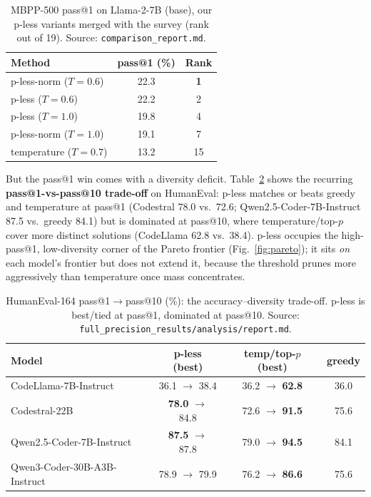\documentclass[11pt]{article}                       %
\begin{document}
\begin{table}[t]\centering
\caption{MBPP-500 pass@1 on Llama-2-7B (base), our p-less variants merged with the
\citet{shi2024decoding} survey (rank out of 19). Source: \texttt{comparison\_report.md}.}
\label{tab:mbpp}
\begin{tabular}{lcc}
\toprule
Method & pass@1 (\%) & Rank \\
\midrule
p-less-norm ($T{=}0.6$) & 22.3 & \textbf{1} \\
p-less ($T{=}0.6$)      & 22.2 & 2 \\
p-less ($T{=}1.0$)      & 19.8 & 4 \\
p-less-norm ($T{=}1.0$) & 19.1 & 7 \\
temperature ($T{=}0.7$) & 13.2 & 15 \\
\bottomrule
\end{tabular}
\end{table}

But the pass@1 win comes with a diversity deficit. Table~\ref{tab:he} shows the recurring
\textbf{pass@1-vs-pass@10 trade-off} on HumanEval: p-less matches or beats greedy and temperature at
pass@1 (Codestral 78.0 vs.\ 72.6; Qwen2.5-Coder-7B-Instruct 87.5 vs.\ greedy 84.1) but is dominated at
pass@10, where temperature/top-$p$ cover more distinct solutions (CodeLlama 62.8 vs.\ 38.4). p-less
occupies the high-pass@1, low-diversity corner of the Pareto frontier (Fig.~\ref{fig:pareto}); it
sits \emph{on} each model's frontier but does not extend it, because the threshold prunes more
aggressively than temperature once mass concentrates.

\begin{table}[t]\centering
\caption{HumanEval-164 pass@1$\to$pass@10 (\%): the accuracy--diversity trade-off. p-less is best/tied
at pass@1, dominated at pass@10. Source: \texttt{full\_precision\_results/analysis/report.md}.}
\label{tab:he}
\begin{tabular}{lccc}
\toprule
Model & p-less (best) & temp/top-$p$ (best) & greedy \\
\midrule
CodeLlama-7B-Instruct        & 36.1 $\to$ 38.4 & 36.2 $\to$ \textbf{62.8} & 36.0 \\
Codestral-22B                & \textbf{78.0} $\to$ 84.8 & 72.6 $\to$ \textbf{91.5} & 75.6 \\
Qwen2.5-Coder-7B-Instruct    & \textbf{87.5} $\to$ 87.8 & 79.0 $\to$ \textbf{94.5} & 84.1 \\
Qwen3-Coder-30B-A3B-Instruct & 78.9 $\to$ 79.9 & 76.2 $\to$ \textbf{86.6} & 75.6 \\
\bottomrule
\end{tabular}
\end{table}
\end{document}
